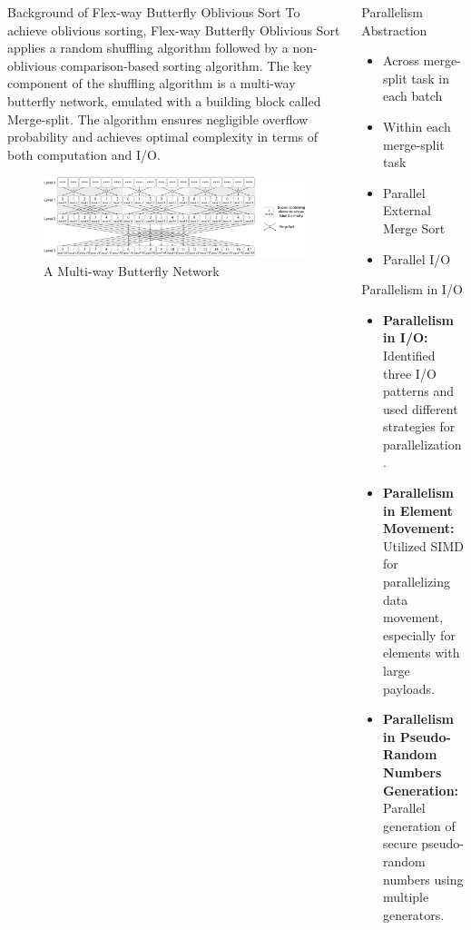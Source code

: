 \documentclass[final,hyperref={pdfpagelabels=false}]{beamer}
\begin{document}
\begin{frame}
\begin{columns}[t]
\begin{column}{.30\linewidth}
      \begin{block}{Background of Flex-way Butterfly Oblivious Sort}
        To achieve oblivious sorting, Flex-way Butterfly Oblivious Sort applies a random shuffling algorithm followed by a non-oblivious comparison-based sorting algorithm. The key component of the shuffling algorithm is a multi-way butterfly network, emulated with a building block called Merge-split. The algorithm ensures negligible overflow probability and achieves optimal complexity in terms of both computation and I/O.
        \begin{figure}
          \includegraphics[width=\linewidth]{assets/multi-way-butterfly.png}
          \caption{A Multi-way Butterfly Network}
        \end{figure}
      \end{block}

    \end{column}

    \begin{column}{.30\linewidth}

      \begin{block}{Parallelism Abstraction}
        \begin{itemize}
          \item Across merge-split task in each batch
          \item Within each merge-split task
          \item Parallel External Merge Sort
          \item Parallel I/O
        \end{itemize}
      \end{block}

      \begin{block}{Parallelism in I/O}
        \begin{itemize}
          \item \textbf{Parallelism in I/O:} Identified three I/O patterns and used different strategies for parallelization.
          \item \textbf{Parallelism in Element Movement:} Utilized SIMD for parallelizing data movement, especially for elements with large payloads.
          \item \textbf{Parallelism in Pseudo-Random Numbers Generation:} Parallel generation of secure pseudo-random numbers using multiple generators.
        \end{itemize}
      \end{block}


\end{column}
\end{columns}
\end{frame}
\end{document}
